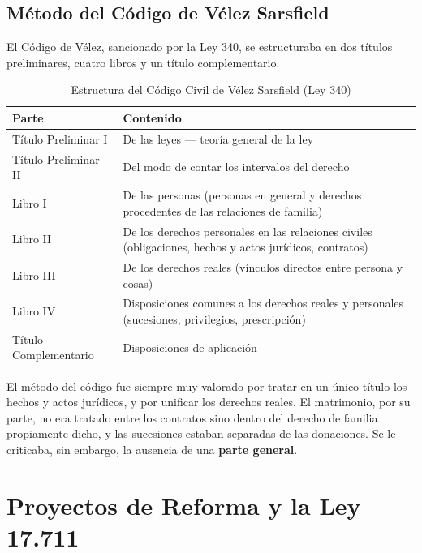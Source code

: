 \documentclass[12pt,oneside]{book}
\begin{document}
\section{Método del Código de Vélez Sarsfield}

El Código de Vélez, sancionado por la Ley 340, se estructuraba en dos títulos preliminares, cuatro libros y un título complementario.

\begin{table}[H]
\centering
\begin{tabular}{@{}p{}p{}@{}}
\toprule
\textbf{Parte} & \textbf{Contenido} \\
\midrule
Título Preliminar I & De las leyes — teoría general de la ley \\
Título Preliminar II & Del modo de contar los intervalos del derecho \\
Libro I & De las personas (personas en general y derechos procedentes de las relaciones de familia) \\
Libro II & De los derechos personales en las relaciones civiles (obligaciones, hechos y actos jurídicos, contratos) \\
Libro III & De los derechos reales (vínculos directos entre persona y cosas) \\
Libro IV & Disposiciones comunes a los derechos reales y personales (sucesiones, privilegios, prescripción) \\
Título Complementario & Disposiciones de aplicación \\
\bottomrule
\end{tabular}
\caption{Estructura del Código Civil de Vélez Sarsfield (Ley 340)}
\end{table}

El método del código fue siempre muy valorado por tratar en un único título los hechos y actos jurídicos, y por unificar los derechos reales. El matrimonio, por su parte, no era tratado entre los contratos sino dentro del derecho de familia propiamente dicho, y las sucesiones estaban separadas de las donaciones. Se le criticaba, sin embargo, la ausencia de una \textbf{parte general}.


\chapter{Proyectos de Reforma y la Ley 17.711}
\end{document}
